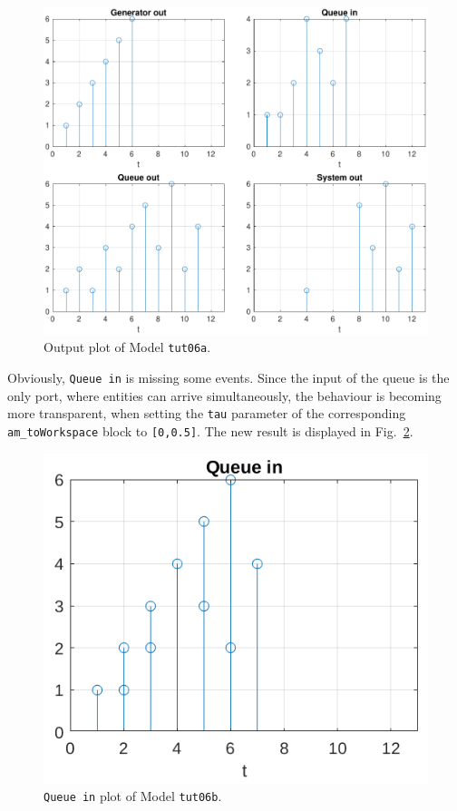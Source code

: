 \documentclass[12pt,oneside,a4paper,bibtotoc,BCOR=0pt,DIV=20]{scrreprt}
\newcommand{\cft}[1]{\mbox{\texttt{#1}}}   %
\begin{document}
\begin{figure}[ht]
\centering
\includegraphics[width=0.48\columnwidth]{images/bild16.pdf}
\caption{Output plot of Model \cft{tut06a}.}
\label{fig_16}
\end{figure}

Obviously, \cft{Queue in} is missing some events. Since the input of the
queue is the only port, where entities can arrive simultaneously, the behaviour
is becoming more transparent, when setting the \cft{tau} parameter of the
corresponding \cft{am\_toWorkspace} block to \cft{[0,0.5]}. The new result is
displayed in Fig.\ \ref{fig_17}.

\begin{figure}[ht]
\centering
\includegraphics[width=0.24\columnwidth]{images/bild17.pdf}
\caption{ \cft{Queue in} plot of Model \cft{tut06b}.}
\label{fig_17}
\end{figure}
\end{document}
